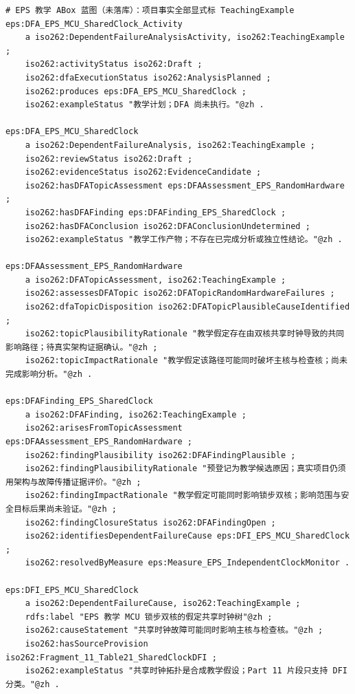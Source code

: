 \nopagebreak[4]
\begin{codebox}
\begin{Verbatim}[fontsize=\small,breaklines=true,breakanywhere=true,breaksymbolleft={},breaksymbolright={}]
# EPS 教学 ABox 蓝图（未落库）：项目事实全部显式标 TeachingExample
eps:DFA_EPS_MCU_SharedClock_Activity
    a iso262:DependentFailureAnalysisActivity, iso262:TeachingExample ;
    iso262:activityStatus iso262:Draft ;
    iso262:dfaExecutionStatus iso262:AnalysisPlanned ;
    iso262:produces eps:DFA_EPS_MCU_SharedClock ;
    iso262:exampleStatus "教学计划；DFA 尚未执行。"@zh .

eps:DFA_EPS_MCU_SharedClock
    a iso262:DependentFailureAnalysis, iso262:TeachingExample ;
    iso262:reviewStatus iso262:Draft ;
    iso262:evidenceStatus iso262:EvidenceCandidate ;
    iso262:hasDFATopicAssessment eps:DFAAssessment_EPS_RandomHardware ;
    iso262:hasDFAFinding eps:DFAFinding_EPS_SharedClock ;
    iso262:hasDFAConclusion iso262:DFAConclusionUndetermined ;
    iso262:exampleStatus "教学工作产物；不存在已完成分析或独立性结论。"@zh .

eps:DFAAssessment_EPS_RandomHardware
    a iso262:DFATopicAssessment, iso262:TeachingExample ;
    iso262:assessesDFATopic iso262:DFATopicRandomHardwareFailures ;
    iso262:dfaTopicDisposition iso262:DFATopicPlausibleCauseIdentified ;
    iso262:topicPlausibilityRationale "教学假定存在由双核共享时钟导致的共同影响路径；待真实架构证据确认。"@zh ;
    iso262:topicImpactRationale "教学假定该路径可能同时破坏主核与检查核；尚未完成影响分析。"@zh .

eps:DFAFinding_EPS_SharedClock
    a iso262:DFAFinding, iso262:TeachingExample ;
    iso262:arisesFromTopicAssessment eps:DFAAssessment_EPS_RandomHardware ;
    iso262:findingPlausibility iso262:DFAFindingPlausible ;
    iso262:findingPlausibilityRationale "预登记为教学候选原因；真实项目仍须用架构与故障传播证据评价。"@zh ;
    iso262:findingImpactRationale "教学假定可能同时影响锁步双核；影响范围与安全目标后果尚未验证。"@zh ;
    iso262:findingClosureStatus iso262:DFAFindingOpen ;
    iso262:identifiesDependentFailureCause eps:DFI_EPS_MCU_SharedClock ;
    iso262:resolvedByMeasure eps:Measure_EPS_IndependentClockMonitor .

eps:DFI_EPS_MCU_SharedClock
    a iso262:DependentFailureCause, iso262:TeachingExample ;
    rdfs:label "EPS 教学 MCU 锁步双核的假定共享时钟树"@zh ;
    iso262:causeStatement "共享时钟故障可能同时影响主核与检查核。"@zh ;
    iso262:hasSourceProvision iso262:Fragment_11_Table21_SharedClockDFI ;
    iso262:exampleStatus "共享时钟拓扑是合成教学假设；Part 11 片段只支持 DFI 分类。"@zh .


\end{Verbatim}
\end{codebox}
